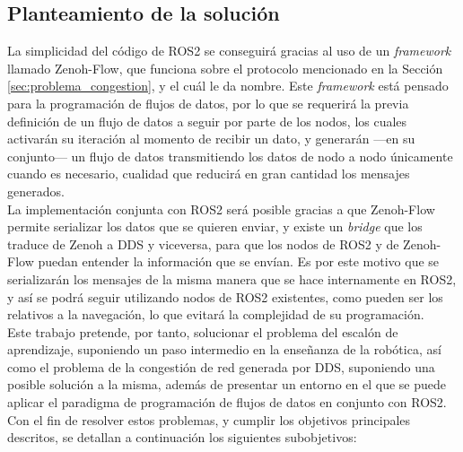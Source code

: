 \subsection{Planteamiento de la solución}
\label{sec:planteamiento_solucion}

La simplicidad del código de ROS2 se conseguirá gracias al uso de un
\textit{framework} llamado Zenoh-Flow, que funciona sobre el protocolo
mencionado en la Sección \ref{sec:problema_congestion}, y el cuál le da
nombre.
Este \textit{framework} está pensado para la programación de flujos de datos,
por lo que se requerirá la previa definición de un flujo de datos a seguir por
parte de los nodos, los cuales activarán su iteración al momento de recibir un
dato, y generarán ---en su conjunto--- un flujo de datos transmitiendo los datos
de nodo a nodo únicamente cuando es necesario, cualidad que reducirá en gran
cantidad los mensajes generados.
\\

La implementación conjunta con ROS2 será posible gracias a que Zenoh-Flow
permite serializar los datos que se quieren enviar, y existe un \textit{bridge}
que los traduce de Zenoh a DDS y viceversa, para que los nodos de ROS2 y de
Zenoh-Flow puedan entender la información que se envían.
Es por este motivo que se serializarán los mensajes de la misma manera que se
hace internamente en ROS2, y así se podrá seguir utilizando nodos de ROS2
existentes, como pueden ser los relativos a la navegación, lo que evitará la
complejidad de su programación.
\\

Este trabajo pretende, por tanto, solucionar el problema del escalón de
aprendizaje, suponiendo un paso intermedio en la enseñanza de la robótica, así
como el problema de la congestión de red generada por DDS, suponiendo una
posible solución a la misma, además de presentar un entorno en el que se puede
aplicar el paradigma de programación de flujos de datos en conjunto con ROS2.
\\

Con el fin de resolver estos problemas, y cumplir los objetivos principales
descritos, se detallan a continuación los siguientes subobjetivos:

